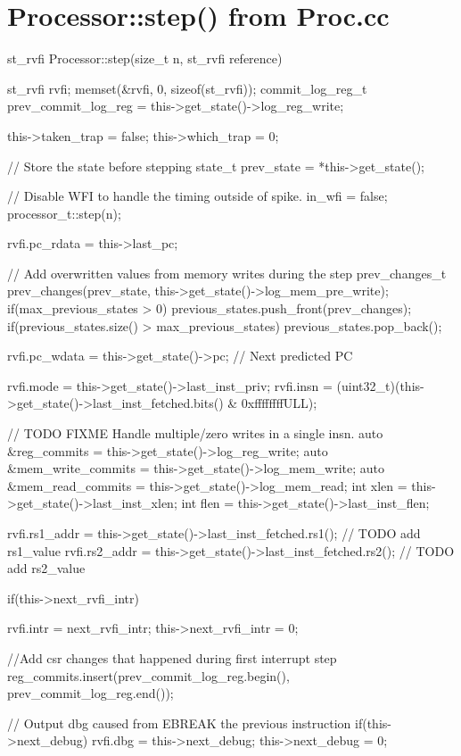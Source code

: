 \section{Processor::step() from Proc.cc}
\label{app:spike_step}


\begin{clisting}
st_rvfi Processor::step(size_t n, st_rvfi reference) {
  st_rvfi rvfi;
  memset(&rvfi, 0, sizeof(st_rvfi));
  commit_log_reg_t prev_commit_log_reg = this->get_state()->log_reg_write;


  this->taken_trap = false;
  this->which_trap = 0;

  // Store the state before stepping
  state_t prev_state = *this->get_state();

  // Disable WFI to handle the timing outside of spike.
  in_wfi = false;
  processor_t::step(n);

  rvfi.pc_rdata = this->last_pc;

  // Add overwritten values from memory writes during the step
  prev_changes_t prev_changes(prev_state, this->get_state()->log_mem_pre_write);
  if(max_previous_states > 0) {
    previous_states.push_front(prev_changes);
  }
  if(previous_states.size() > max_previous_states) {
    previous_states.pop_back();
  }

  rvfi.pc_wdata = this->get_state()->pc; // Next predicted PC

  rvfi.mode = this->get_state()->last_inst_priv;
  rvfi.insn =
      (uint32_t)(this->get_state()->last_inst_fetched.bits() & 0xffffffffULL);

  // TODO FIXME Handle multiple/zero writes in a single insn.
  auto &reg_commits = this->get_state()->log_reg_write;
  auto &mem_write_commits = this->get_state()->log_mem_write;
  auto &mem_read_commits = this->get_state()->log_mem_read;
  int xlen = this->get_state()->last_inst_xlen;
  int flen = this->get_state()->last_inst_flen;

  rvfi.rs1_addr = this->get_state()->last_inst_fetched.rs1();
  // TODO add rs1_value
  rvfi.rs2_addr = this->get_state()->last_inst_fetched.rs2();
  // TODO add rs2_value


  if(this->next_rvfi_intr){
    rvfi.intr = next_rvfi_intr;
    this->next_rvfi_intr = 0;

    //Add csr changes that happened during first interrupt step
    reg_commits.insert(prev_commit_log_reg.begin(), prev_commit_log_reg.end());
  }
  
  // Output dbg caused from EBREAK the previous instruction
  if(this->next_debug) {
    rvfi.dbg = this->next_debug;
    this->next_debug = 0;
  }

}
\end{clisting}
